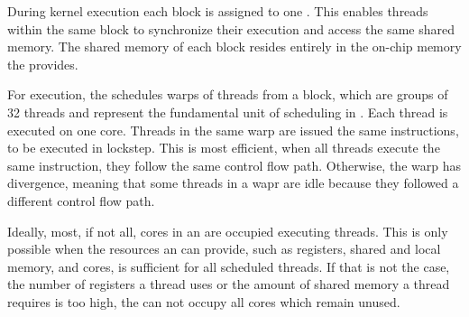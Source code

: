During kernel execution each block is assigned to one \sm.
This enables threads within the same block to synchronize their execution and access the same shared memory.
The shared memory of each block resides entirely in the on-chip memory the \sm provides\cite{hwu_programming_2023}.

For execution, the \sm schedules warps of threads from a block, which are groups of 32 threads and represent the fundamental unit of scheduling in \cuda.
Each thread is executed on one \cuda core.
Threads in the same warp are issued the same instructions, to be executed in lockstep.
This is most efficient, when all threads execute the same instruction, \ie they follow the same control flow path.
Otherwise, the warp has divergence, meaning that some threads in a wapr are idle because they followed a different control flow path\cite{hwu_programming_2023}.

Ideally, most, if not all, cores in an \sm are occupied executing threads.
This is only possible when the resources an \sm can provide, such as registers, shared and local memory, and cores, is sufficient for all scheduled threads.
If that is not the case, \eg the number of registers a thread uses or the amount of shared memory a thread requires is too high, the \sm can not occupy all cores which remain unused\cite{hwu_programming_2023}.
